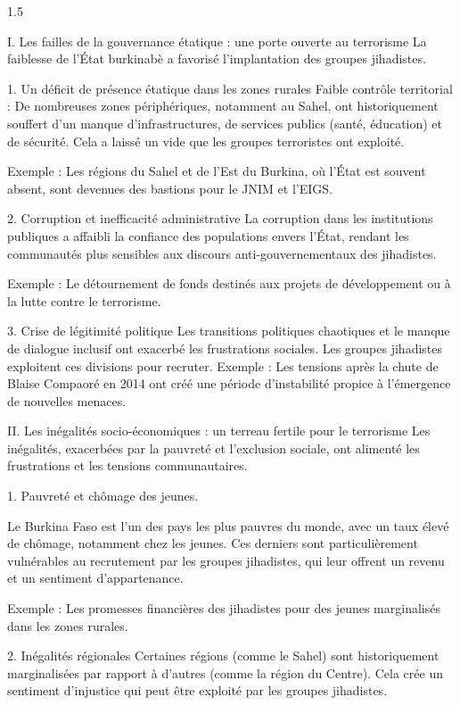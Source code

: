 \documentclass[12pt]{article}
\begin{document}
\begin{spacing}{1.5}
\quad
\quad


I. Les failles de la gouvernance étatique : une porte ouverte au terrorisme
La faiblesse de l'État burkinabè a favorisé l'implantation des groupes jihadistes.

1. Un déficit de présence étatique dans les zones rurales
Faible contrôle territorial : De nombreuses zones périphériques, notamment au Sahel, ont historiquement souffert d'un manque d'infrastructures, de services publics (santé, éducation) et de sécurité. Cela a laissé un vide que les groupes terroristes ont exploité.

Exemple : Les régions du Sahel et de l'Est du Burkina, où l'État est souvent absent, sont devenues des bastions pour le JNIM et l'EIGS.

2. Corruption et inefficacité administrative
La corruption dans les institutions publiques a affaibli la confiance des populations envers l'État, rendant les communautés plus sensibles aux discours anti-gouvernementaux des jihadistes.

Exemple : Le détournement de fonds destinés aux projets de développement ou à la lutte contre le terrorisme.

3. Crise de légitimité politique
Les transitions politiques chaotiques et le manque de dialogue inclusif ont exacerbé les frustrations sociales. Les groupes jihadistes exploitent ces divisions pour recruter.
Exemple : Les tensions après la chute de Blaise Compaoré en 2014 ont créé une période d'instabilité propice à l'émergence de nouvelles menaces.

\quad
II. Les inégalités socio-économiques : un terreau fertile pour le terrorisme
Les inégalités, exacerbées par la pauvreté et l'exclusion sociale, ont alimenté les frustrations et les tensions communautaires.

1. Pauvreté et chômage des jeunes.

Le Burkina Faso est l'un des pays les plus pauvres du monde, avec un taux élevé de chômage, notamment chez les jeunes. Ces derniers sont particulièrement vulnérables au recrutement par les groupes jihadistes, qui leur offrent un revenu et un sentiment d'appartenance.

Exemple : Les promesses financières des jihadistes pour des jeunes marginalisés dans les zones rurales.

2. Inégalités régionales
Certaines régions (comme le Sahel) sont historiquement marginalisées par rapport à d'autres (comme la région du Centre). Cela crée un sentiment d'injustice qui peut être exploité par les groupes jihadistes.


\end{spacing}
\end{document}
